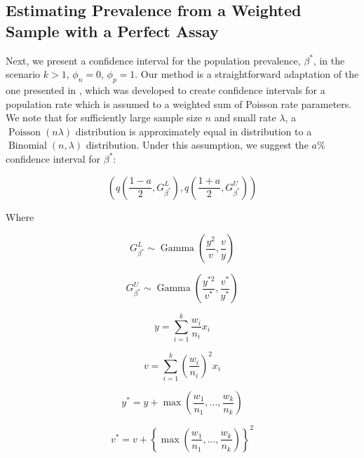 \documentclass[AMA,STIX1COL]{WileyNJD-v2}
\begin{document}
\subsection{Estimating Prevalence from a Weighted Sample with a Perfect Assay}
\label{sec:weight-perfect}
Next, we present a confidence interval for the population prevalence, \( \beta^* \), in the scenario \( k > 1 \), \( \phi_n = 0 \), \( \phi_p = 1 \).
Our method is a straightforward adaptation of the one presented in \cite{FayF:1997}, which was developed to create confidence intervals for a population rate which is assumed to a weighted sum of Poisson rate parameters.
We note that for sufficiently large sample size \( n \) and small rate \( \lambda \), a \( \operatorname{Poisson}(n\lambda) \) distribution is approximately equal in distribution to a \( \operatorname{Binomial}(n, \lambda) \) distribution.
Under this assumption, we suggest the \( a \)\% confidence interval for \( \beta^* \):

\begin{equation}
    \left( q\left( \frac{1 - a}{2}, G_{\beta^*}^L \right), q \left( \frac{1 + a}{2},  G_{\beta^*}^U \right) \right)
\end{equation}


Where

\begin{equation}
    G_{\beta^*}^L \sim \operatorname{Gamma}\left( \frac{y^2}{v}, \frac{v}{y} \right)
\end{equation}

\begin{equation}
    G_{\beta^*}^U \sim \operatorname{Gamma}\left( \frac{y^{*2}}{v^*}, \frac{v^*}{y^*} \right)
\end{equation}

\begin{equation}
    y = \sum_{i=1}^k \frac{w_i}{n_i} x_i
\end{equation}

\begin{equation}
    v = \sum_{i=1}^k \left( \frac{w_i}{n_i}\right)^2 x_i
\end{equation}

\begin{equation}
    y^* = y + \max\left(\frac{w_1}{n_1}, \ldots, \frac{w_k}{n_k} \right)
\end{equation}

\begin{equation}
    v^* = v + \left\{ \max\left(\frac{w_1}{n_1}, \ldots, \frac{w_k}{n_k} \right) \right\}^2
\end{equation}
\end{document}
